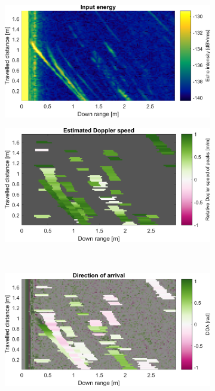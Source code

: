 \begin{figure}[htbp]
    \centering
    \begin{subfigure}[t]{0.475\linewidth}
        \centering
        \includegraphics[width=\linewidth,max height=.475\textheight]{gfx/results/lobby_input.png}
    \end{subfigure}%
    \hfill%
    \begin{subfigure}[t]{0.475\linewidth}
        \centering
        \includegraphics[width=\linewidth,max height=.475\textheight]{gfx/results/lobby_doppler.png}
    \end{subfigure}\bigskip\\
    \begin{subfigure}[t]{0.475\linewidth}  
        \centering 
        \includegraphics[width=\linewidth,max height=.475\textheight]{gfx/results/lobby_doa.png}

\end{subfigure}
\end{figure}
